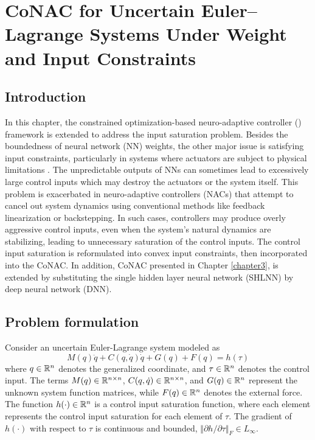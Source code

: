 
\chapter{
    CoNAC for Uncertain Euler–Lagrange Systems Under Weight and Input Constraints
} \label{chapter4}

\section{Introduction}

In this chapter, the constrained optimization-based neuro-adaptive controller () framework is extended to address the input saturation problem. 
Besides the boundedness of neural network (NN) weights, the other major issue is satisfying input constraints, particularly in systems where actuators are subject to physical limitations \cite{RN24}.
The unpredictable outputs of NNs can sometimes lead to excessively large control inputs which may destroy the actuators or the system itself. 
This problem is exacerbated in neuro-adaptive controllers (NACs) that attempt to cancel out system dynamics using conventional methods like feedback linearization or backstepping. 
In such cases, controllers may produce overly aggressive control inputs, even when the system’s natural dynamics are stabilizing, leading to unnecessary saturation of the control inputs.
The control input saturation is reformulated into convex input constraints, then incorporated into the CoNAC. 
In addition, CoNAC presented in Chapter \ref{chapter3}, is extended by substituting the single hidden layer neural network (SHLNN) by deep neural network (DNN).

\section{Problem formulation} \label{chap4:problem}

Consider an uncertain Euler-Lagrange system modeled as
\begin{equation}
    M(q)\ddot q + C(q,\dot q)\dot q + G(q) + F(q) = h(\tau)
    \label{chap4:eq:sys1}
\end{equation}
where $q\in \mathbb{R}^n$ denotes the generalized coordinate, and $\tau\in\mathbb{R}^n$ denotes the control input. 
The terms $M(q)\in\mathbb{R}^{n\times n}$, $C(q,\dot q)\in\mathbb{R}^{n\times n}$, and $G(q)\in\mathbb{R}^{n}$ represent the unknown system function matrices, while $F(q)\in\mathbb{R}^{n}$ denotes the external force. 
The function $h(\cdot)\in \mathbb{R}^n$ is a control input saturation function, where each element represents the control input saturation for each element of $\tau$. 
The gradient of $h(\cdot)$ with respect to $\tau$ is continuous and bounded, \ie $\Vert\partial h/\partial \tau\Vert_F\in L_\infty$. 

